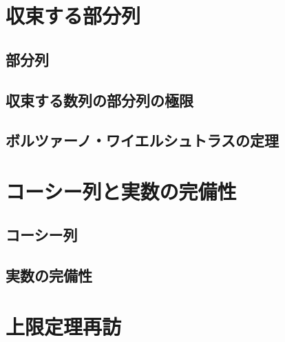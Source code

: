\documentclass[../math-imaging]{subfiles}
\begin{document}

\section{収束する部分列}

\subsection{部分列}


\subsection{収束する数列の部分列の極限}


\subsection{ボルツァーノ・ワイエルシュトラスの定理}


\section{コーシー列と実数の完備性}

\subsection{コーシー列}


\subsection{実数の完備性}


\section{上限定理再訪}

\end{document}
